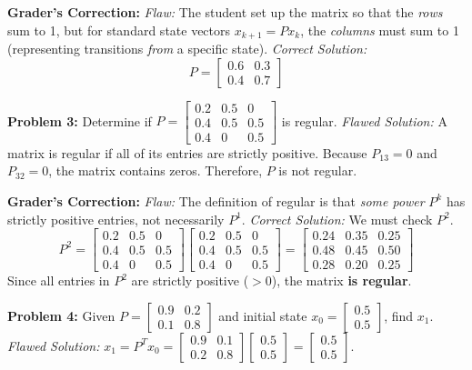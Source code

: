 \documentclass[11pt, letterpaper]{article}
\theoremstyle{definition}
\theoremstyle{remark}
\begin{document}
\textbf{Grader's Correction:}
\textit{Flaw:} The student set up the matrix so that the \textit{rows} sum to 1, but for standard state vectors $x_{k+1} = Px_k$, the \textit{columns} must sum to 1 (representing transitions \textit{from} a specific state).
\textit{Correct Solution:} 
\[ P = \begin{bmatrix} 0.6 & 0.3 \\ 0.4 & 0.7 \end{bmatrix} \]

\vspace{1em}
\textbf{Problem 3:} Determine if $P = \begin{bmatrix} 0.2 & 0.5 & 0 \\ 0.4 & 0.5 & 0.5 \\ 0.4 & 0 & 0.5 \end{bmatrix}$ is regular.
\textit{Flawed Solution:} A matrix is regular if all of its entries are strictly positive. Because $P_{13} = 0$ and $P_{32} = 0$, the matrix contains zeros. Therefore, $P$ is not regular.

\textbf{Grader's Correction:}
\textit{Flaw:} The definition of regular is that \textit{some power} $P^k$ has strictly positive entries, not necessarily $P^1$.
\textit{Correct Solution:} We must check $P^2$. 
\[ P^2 = \begin{bmatrix} 0.2 & 0.5 & 0 \\ 0.4 & 0.5 & 0.5 \\ 0.4 & 0 & 0.5 \end{bmatrix} \begin{bmatrix} 0.2 & 0.5 & 0 \\ 0.4 & 0.5 & 0.5 \\ 0.4 & 0 & 0.5 \end{bmatrix} = \begin{bmatrix} 0.24 & 0.35 & 0.25 \\ 0.48 & 0.45 & 0.50 \\ 0.28 & 0.20 & 0.25 \end{bmatrix} \]
Since all entries in $P^2$ are strictly positive ($>0$), the matrix \textbf{is regular}.

\vspace{1em}
\textbf{Problem 4:} Given $P = \begin{bmatrix} 0.9 & 0.2 \\ 0.1 & 0.8 \end{bmatrix}$ and initial state $x_0 = \begin{bmatrix} 0.5 \\ 0.5 \end{bmatrix}$, find $x_1$.
\textit{Flawed Solution:} $x_1 = P^T x_0 = \begin{bmatrix} 0.9 & 0.1 \\ 0.2 & 0.8 \end{bmatrix} \begin{bmatrix} 0.5 \\ 0.5 \end{bmatrix} = \begin{bmatrix} 0.5 \\ 0.5 \end{bmatrix}$.
\end{document}
